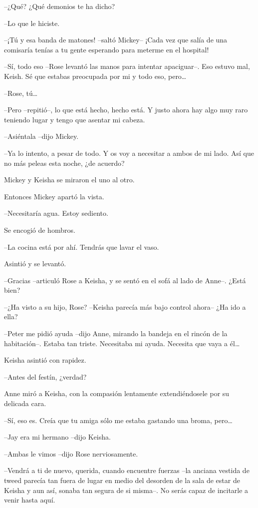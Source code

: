 {--¿Qué? ¿Qué demonios te ha dicho?}

{--Lo que le hiciste.}

{--¡Tú y esa banda de matones! --saltó Mickey-- ¡Cada vez que salía de
una comisaría tenías a tu gente esperando para meterme en el hospital!}

{--Sí, todo eso --Rose levantó las manos para intentar apaciguar--. Eso
 estuvo mal, Keish. Sé que estabas preocupada por mi y todo eso,
 pero\ldots{}}

{--Rose, tú\ldots{}}

{--Pero --repitió--, lo que está hecho, hecho está. Y justo ahora hay
algo muy raro teniendo lugar y tengo que asentar mi cabeza.}

{--Asiéntala --dijo Mickey.}

{--Ya lo intento, a pesar de todo. Y os voy a necesitar a ambos de mi
lado. Así que no más peleas esta noche, ¿de acuerdo?}

{Mickey y Keisha se miraron el uno al otro.}

{Entonces Mickey apartó la vista.}

{--Necesitaría agua. Estoy sediento.}

{Se encogió de hombros.}

{--La cocina está por ahí. Tendrás que lavar el vaso.}

{Asintió y se levantó.}

{--Gracias --articuló Rose a Keisha, y se sentó en el sofá al lado de
Anne--. ¿Está bien?}

{--¿Ha visto a su hijo, Rose? --Keisha parecía más bajo control ahora--
¿Ha ido a ella?}

{--Peter me pidió ayuda --dijo Anne, mirando la bandeja en el rincón de
 la habitación--. Estaba tan triste. Necesitaba mi ayuda. Necesita que
 vaya a él\ldots{}}

{Keisha asintió con rapidez.}

{--Antes del festín, ¿verdad?}

{Anne miró a Keisha, con la compasión lentamente extendiéndosele por su
delicada cara.}

{--Sí, eso es. Creía que tu amiga sólo me estaba gastando una broma,
 pero\ldots{}}

{--Jay era mi hermano --dijo Keisha.}

{--Ambas le vimos --dijo Rose nerviosamente.}

{--Vendrá a ti de nuevo, querida, cuando encuentre fuerzas --la anciana
 vestida de tweed parecía tan fuera de lugar en medio del desorden de la
 sala de estar de Keisha y aun así, sonaba tan segura de si misma--. No
serás capaz de incitarle a venir hasta aquí.}

